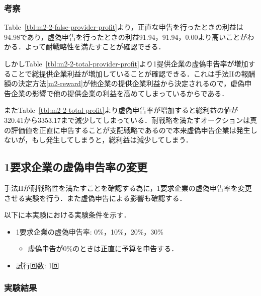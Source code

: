 \hypertarget{ux8003ux5bdf-5}{%
\subsubsection{考察}\label{ux8003ux5bdf-5}}

Table~\ref{tbl:m2-2-false-provider-profit}より，正直な申告を行ったときの利益は94.98であり，虚偽申告を行ったときの利益91.94，91.94，0.00より高いことがわかる．よって耐戦略性を満たすことが確認できる．

しかしTable~\ref{tbl:m2-2-total-provider-profit}より1提供企業の虚偽申告率が増加することで総提供企業利益が増加していることが確認できる．これは手法IIの報酬額の決定方法\eqref{m2-reward}が他企業の提供企業利益から決定されるので，虚偽申告企業の影響で他の提供企業の利益を高めてしまっているからである．

またTable~\ref{tbl:m2-2-total-profit}より虚偽申告率が増加すると総利益の値が320.41から3353.17まで減少してしまっている．耐戦略を満たすオークションは真の評価値を正直に申告することが支配戦略であるので本来虚偽申告企業は発生しないが，もし発生してしまうと，総利益は減少してしまう．

\hypertarget{ux8981ux6c42ux4f01ux696dux306eux865aux507dux7533ux544aux7387ux306eux5909ux66f4-1}{%
\subsection{1要求企業の虚偽申告率の変更}\label{ux8981ux6c42ux4f01ux696dux306eux865aux507dux7533ux544aux7387ux306eux5909ux66f4-1}}

手法IIが耐戦略性を満たすことを確認する為に，1要求企業の虚偽申告率を変更させる実験を行う．また虚偽申告による影響も確認する．

以下に本実験における実験条件を示す．

\begin{itemize}
\tightlist
\item
  1要求企業の虚偽申告率: 0\%，10\%，20\%，30\%

  \begin{itemize}
  \tightlist
  \item
    虚偽申告が0\%のときは正直に予算を申告する．
  \end{itemize}
\item
  試行回数: 1回
\end{itemize}

\hypertarget{ux5b9fux9a13ux7d50ux679c-5}{%
\subsubsection{実験結果}\label{ux5b9fux9a13ux7d50ux679c-5}}

